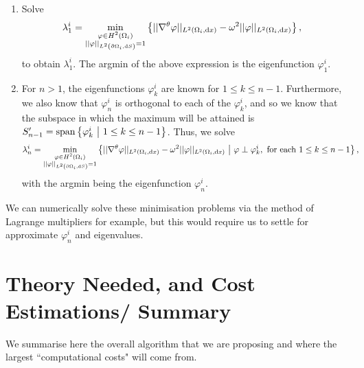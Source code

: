 \documentclass[11pt]{report}
\newcommand{\gradgradSob}[1]{H^2\bracs{#1}}
\begin{document}
\begin{enumerate}
	\item Solve
	\begin{align*}
		\lambda_1^i &= \min_{\substack{\varphi\in\gradgradSob{\ddom_i} \\ \norm{\varphi}_{\ltwo{\partial\ddom_i}{S}}=1}} \clbracs{ \norm{\tgrad \varphi}_{\ltwo{\ddom_i}{x}} - \omega^2 \norm{\varphi}_{\ltwo{\ddom_i}{x}} },
	\end{align*}
	to obtain $\lambda_1^i$.
	The argmin of the above expression is the eigenfunction $\varphi_1^i$.
	\item For $n>1$, the eigenfunctions $\varphi_k^i$ are known for $1\leq k\leq n-1$.
	Furthermore, we also know that $\varphi_n^i$ is orthogonal to each of the $\varphi_k^i$, and so we know that the subspace in which the maximum will be attained is $S'_{n-1} = \mathrm{span}\left\{ \varphi_k^i \ \middle\vert \  1\leq k\leq n-1 \right\}$.
	Thus, we solve
	\begin{align*}
		\lambda_n^i &= \min_{\substack{\varphi\in\gradgradSob{\ddom_i} \\ \norm{\varphi}_{\ltwo{\partial\ddom_i}{S}}=1}} \clbracs{ \norm{\tgrad \varphi}_{\ltwo{\ddom_i}{x}} - \omega^2 \norm{\varphi}_{\ltwo{\ddom_i}{x}} \setVert \varphi\perp\varphi_k^i, \text{ for each } 1\leq k\leq n-1 },
	\end{align*}
	with the argmin being the eigenfunction $\varphi_n^i$.
\end{enumerate}

We can numerically solve these minimisation problems via the method of Lagrange multipliers for example, but this would require us to settle for approximate $\varphi_n^i$ and eigenvalues.

\section*{Theory Needed, and Cost Estimations/ Summary}
We summarise here the overall algorithm that we are proposing and where the largest ``computational costs" will come from.
\end{document}
